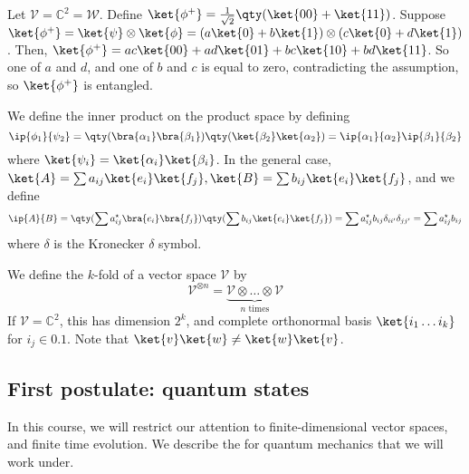 Let $\mathcal V = \mathbb C^2 = \mathcal W$.
Define $\ket{\phi^+} = \frac{1}{\sqrt{2}} \qty(\ket{00} + \ket{11})$.
Suppose $\ket{\phi^+} = \ket{\psi}\otimes\ket{\phi} = (a\ket{0} + b\ket{1}) \otimes (c\ket{0} + d\ket{1})$.
Then, $\ket{\phi^+} = ac \ket{00} + ad \ket{01} + bc \ket{10} + bd \ket{11}$.
So one of $a$ and $d$, and one of $b$ and $c$ is equal to zero, contradicting the assumption, so $\ket{\phi^+}$ is entangled.

We define the inner product on the product space by defining
\[ \ip{\phi_1}{\psi_2} = \qty(\bra{\alpha_1} \bra{\beta_1})\qty(\ket{\beta_2} \ket{\alpha_2}) = \ip{\alpha_1}{\alpha_2} \ip{\beta_1}{\beta_2} \]
where $\ket{\psi_i} = \ket{\alpha_i}\ket{\beta_i}$.
In the general case, $\ket{A} = \sum a_{ij} \ket{e_i}\ket{f_j}, \ket{B} = \sum b_{ij} \ket{e_i}\ket{f_j}$, and we define
\[ \ip{A}{B} = \qty(\sum a_{ij}^\star \bra{e_i} \bra{f_j}) \qty(\sum b_{ij} \ket{e_i} \ket{f_j}) = \sum a_{ij}^\star b_{ij} \delta_{ii'}\delta_{jj'} = \sum a_{ij}^\star b_{ij} \]
where $\delta$ is the Kronecker $\delta$ symbol.

We define the $k$-fold  of a vector space $\mathcal V$ by
\[ \mathcal V^{\otimes n} = \underbrace{\mathcal V \otimes \dots \otimes \mathcal V}_{n \text{ times}} \]
If $\mathcal V = \mathbb C^2$, this has dimension $2^k$, and complete orthonormal basis $\ket{i_1 \dots i_k}$ for $i_j \in \qty{0,1}$.
Note that $\ket{v}\ket{w} \neq \ket{w}\ket{v}$.

\subsection{First postulate: quantum states}
In this course, we will restrict our attention to finite-dimensional vector spaces, and finite time evolution.
We describe the  for quantum mechanics that we will work under.

